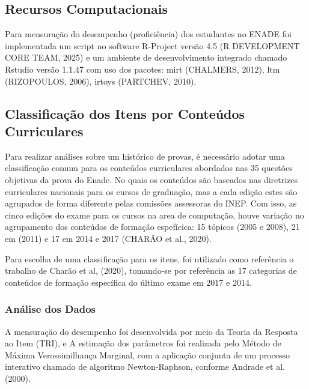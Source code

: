 \documentclass[12pt]{article}
\begin{document}
\subsection{Recursos Computacionais}
\label{sec:metbet}

Para mensuração do desempenho (proficiência) dos estudantes no ENADE foi implementada um script no software R-Project versão 4.5 (R DEVELOPMENT CORE TEAM, 2025) e um ambiente de desenvolvimento integrado chamado Rstudio versão 1.1.47 com uso dos pacotes: mirt (CHALMERS, 2012), ltm (RIZOPOULOS, 2006), irtoys (PARTCHEV, 2010).


\newpage
\subsection{Classificação dos Itens por Conteúdos Curriculares}

Para realizar análises sobre um histórico de provas, é necessário adotar uma classificação comum para os conteúdos curriculares abordados nas 35 questões objetivas da prova do Enade. No quais os conteúdos são baseados nas diretrizes curriculares nacionais para os cursos de graduação, mas a cada edição estes são agrupados de forma diferente pelas comissões assessoras do INEP. Com isso, as cinco edições do exame para os cursos na area de computação, houve variação no agrupamento dos conteúdos de formação espefícica: 15 tópicos (2005 e 2008), 21 em (2011) e 17 em 2014 e 2017 (CHARÃO et al., 2020).

Para escolha de uma classificação para os itens, foi utilizado como referência o trabalho de Charão et al, (2020), tomando-se por referência as 17 categorias de conteúdos de formação específica do último exame em 2017 e 2014. 


\subsubsection{Análise dos Dados}

A mensuração do desempenho foi desenvolvida por meio da Teoria da Resposta ao Item (TRI), e A estimação dos parâmetros foi realizada pelo Método de Máxima Verossimilhança Marginal, com a aplicação conjunta de um processo interativo chamado de algoritmo Newton-Raphson, conforme Andrade et al. (2000). 
\end{document}
